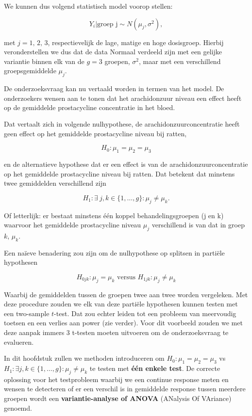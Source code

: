 \documentclass[
  12pt,dutch,coursenotes]{book}
\begin{document}
We kunnen dus volgend statistisch model voorop stellen:

\[Y_i \vert \text{groep j} \sim N(\mu_j,\sigma^2),\]

met \(j= \text{1, 2, 3}\), respectievelijk de lage, matige en hoge dosisgroep. Hierbij veronderstellen we dus dat de data Normaal verdeeld zijn met een gelijke variantie binnen elk van de \(g=3\) groepen, \(\sigma^2\), maar met een verschillend groepsgemiddelde \(\mu_j\).

De onderzoeksvraag kan nu vertaald worden in termen van het model.
De onderzoekers wensen aan te tonen dat het arachidonzuur niveau een effect heeft op de gemiddelde prostacycline concentratie in het bloed.

Dat vertaalt zich in volgende nulhypothese, de arachidonzuurconcentratie heeft geen effect op het gemiddelde prostacycline niveau bij ratten,

\[H_0:\mu_1=\mu_2 = \mu_3\]

en de alternatieve hypothese dat er een effect is van de arachidonzuurconcentratie op het gemiddelde prostacycline niveau bij ratten. Dat betekent dat minstens twee gemiddelden verschillend zijn

\[H_1: \exists\ j,k \in \{1,\ldots,g\} : \mu_j\neq\mu_k.\]

Of letterlijk: er bestaat minstens één koppel behandelingsgroepen (j en k) waarvoor het gemiddelde prostacycline niveau \(\mu_j\) verschillend is van dat in groep \(k\), \(\mu_k\).

Een naïeve benadering zou zijn om de nulhypothese op splitsen in partiële hypothesen

\[H_{0jk}: \mu_j=\mu_k \text{ versus } H_{1jk}: \mu_j \neq \mu_k\]

Waarbij de gemiddelden tussen de groepen twee aan twee worden vergeleken.
Met deze procedure zouden we elk van deze partiële hypothesen kunnen testen met een two-sample \(t\)-test.
Dat zou echter leiden tot een probleem van meervoudig toetsen en een verlies aan power (zie verder).
Voor dit voorbeeld zouden we met deze aanpak immers 3 t-testen moeten uitvoeren om de onderzoeksvraag te evalueren.

In dit hoofdstuk zullen we methoden introduceren om \(H_0:\mu_1=\mu_2=\mu_3\) vs \(H_1: \exists j,k \in \{1,\ldots,g\} : \mu_j\neq\mu_k\) te testen met \textbf{één enkele test}.
De correcte oplossing voor het testprobleem waarbij we een continue response meten en wensen te detecteren of er een verschil is in gemiddelde response tussen meerdere groepen wordt een \textbf{variantie-analyse of ANOVA} (ANalysis Of VAriance) genoemd.
\end{document}
